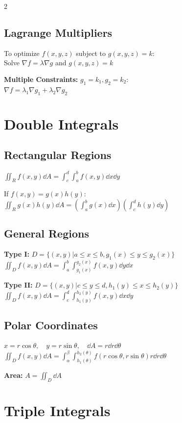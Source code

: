 \documentclass[8pt]{extarticle}
\begin{document}
\begin{multicols}{2}
\subsection*{Lagrange Multipliers}
To optimize $f(x,y,z)$ subject to $g(x,y,z) = k$: \\
Solve $\nabla f = \lambda \nabla g$ and $g(x,y,z) = k$

\textbf{Multiple Constraints:} $g_1 = k_1, g_2 = k_2$: \\
$\nabla f = \lambda_1 \nabla g_1 + \lambda_2 \nabla g_2$

\section*{Double Integrals}

\subsection*{Rectangular Regions}
$\iint_R f(x,y) \dd{A} = \int_c^d \int_a^b f(x,y) \dd{x}\dd{y}$

If $f(x,y) = g(x)h(y)$: \\
$\iint_R g(x)h(y) \dd{A} = \left(\int_a^b g(x)\dd{x}\right)\left(\int_c^d h(y)\dd{y}\right)$

\subsection*{General Regions}
\textbf{Type I:} $D = \{(x,y) | a \le x \le b, g_1(x) \le y \le g_2(x)\}$ \\
$\iint_D f(x,y) \dd{A} = \int_a^b \int_{g_1(x)}^{g_2(x)} f(x,y) \dd{y}\dd{x}$

\textbf{Type II:} $D = \{(x,y) | c \le y \le d, h_1(y) \le x \le h_2(y)\}$ \\
$\iint_D f(x,y) \dd{A} = \int_c^d \int_{h_1(y)}^{h_2(y)} f(x,y) \dd{x}\dd{y}$

\subsection*{Polar Coordinates}
$x = r\cos\theta, \quad y = r\sin\theta, \quad \dd{A} = r\dd{r}\dd{\theta}$ \\
$\iint_D f(x,y) \dd{A} = \int_\alpha^\beta \int_{h_1(\theta)}^{h_2(\theta)} f(r\cos\theta,r\sin\theta) r\dd{r}\dd{\theta}$

\textbf{Area:} $A = \iint_D \dd{A}$

\section*{Triple Integrals}


\end{multicols}
\end{document}
